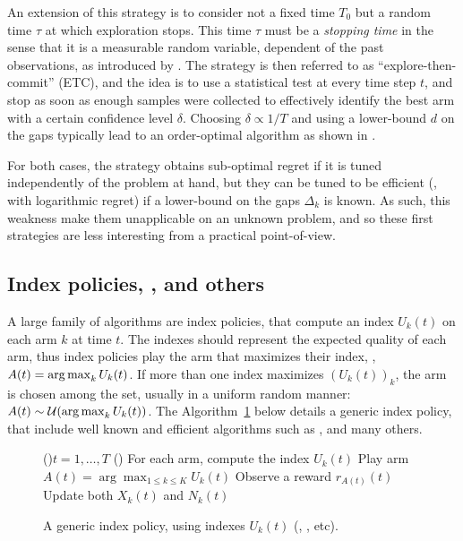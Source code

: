 An extension of this strategy is to consider not a fixed time $T_0$ but a random time $\tau$ at which exploration stops.
This time $\tau$ must be a \emph{stopping time} in the sense that it is a measurable random variable, dependent of the past observations, as introduced by \cite{Wald45}. The strategy is then referred to as ``explore-then-commit'' (ETC), and the idea is to use a statistical test at every time step $t$, and stop as soon as enough samples were collected to effectively identify the best arm with a certain confidence level $\delta$.
Choosing $\delta \propto 1/T$ and using a lower-bound $d$ on the gaps typically lead to an order-optimal algorithm as shown in \cite{GarivierETC2016}.


For both cases, the strategy obtains sub-optimal regret if it is tuned independently of the problem at hand, but they can be tuned to be efficient (\ie, with logarithmic regret) if a lower-bound on the gaps $\Delta_k$ is known.
As such, this weakness make them unapplicable on an unknown problem, and so these first strategies are less interesting from a practical point-of-view.


\subsection{Index policies, \UCB, \klUCB{} and others}

A large family of algorithms are index policies, that compute an index $U_k(t)$ on each arm $k$ at time $t$.
The indexes should represent the expected quality of each arm, thus index policies play the arm that maximizes their index, \ie, $A(t) = \operatorname*{arg\,max}_k U_k(t)$.
If more than one index maximizes $(U_k(t))_k$, the arm is chosen among the set, usually in a uniform random manner: $A(t) \sim \mathcal{U}(\operatorname*{arg\,max}_k U_k(t))$.
%
The Algorithm~\ref{algo:2:indexPolicy} below details a generic index policy, that include well known and efficient algorithms such as \UCB, \klUCB{} and many others.

\begin{figure}[h!]
	\centering
    \begin{framed}
	\begin{algorithm}[H]
		\For(){$t = 1, \dots, T$}{
			\Else(){
                For each arm, compute the index $U_k(t)$\;
                Play arm $A(t) = \arg\max_{1\leq k \leq K} U_k(t)$\;
            }
            Observe a reward $r_{A(t)}(t)$\;
            Update both $X_k(t)$ and $N_k(t)$\;
		}
		\caption{A generic index policy, using indexes $U_k(t)$ (\eg, \UCB, \klUCB{} etc).}
		\label{algo:2:indexPolicy}
	\end{algorithm}
	\end{framed}
\end{figure}


